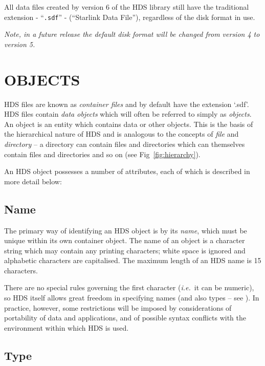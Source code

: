 \documentclass[twoside,11pt]{starlink}
\providecommand{\st}[1]{{\emph{#1}}}
\begin{document}
All data files created by version 6 of the HDS library still have the
traditional extension - ``\texttt{.sdf}'' - (``Starlink Data File''),
regardless of the disk format in use.

\begin{center}
\emph{ Note, in a future release the default disk format will be changed from
version 4 to version 5.}
\end{center}

\section{\label{sect:objects}OBJECTS}

HDS files are known as \st{container files} and by default have the
extension `.sdf'.  HDS files contain \st{data objects} which will
often be referred to simply as \st{objects}. An object is an entity
which contains data or other objects. This is the basis of the
hierarchical nature of HDS and is analogous to the concepts of
\st{file} and \st{directory} -- a directory can contain files and
directories which can themselves contain files and directories and so
on (see Fig~\ref{fig:hierarchy}).

An HDS object possesses a number of attributes, each of which is
described in more detail below:

\subsection{\label{sect:name}Name}

The primary way of identifying an HDS object is by its \st{name},
which must be unique within its own container object.  The name of an
object is a character string which may contain any printing
characters; white space is ignored and alphabetic characters are
capitalised. The maximum length of an HDS name is 15 characters.

There are no special rules governing the first character
(\st{i.e.}\ it can be numeric), so HDS itself allows great freedom in specifying
names (and also types -- see ). In practice,
however, some restrictions will be imposed by considerations of
portability of data and applications, and of possible syntax conflicts
with the environment within which HDS is used.

\subsection{\label{sect:type}Type}
\end{document}
